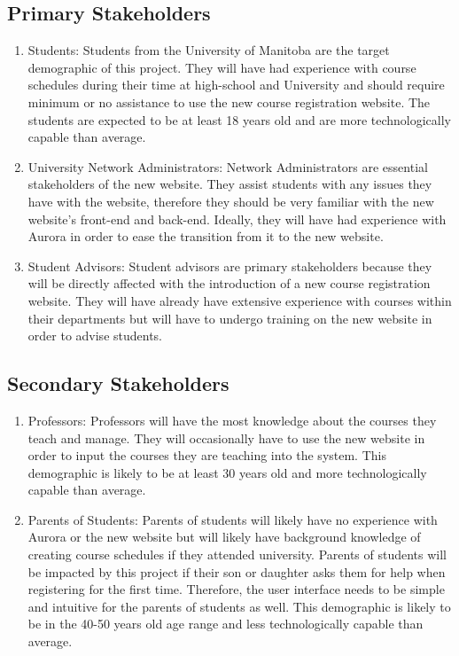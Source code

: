 \documentclass{article}
\begin{document}
\subsection{Primary Stakeholders}
\begin{enumerate}
    \item Students: Students from the University of Manitoba are the target demographic of this project. They will have had experience with course schedules during their time at high-school and University and should require minimum or no assistance to use the new course registration website. The students are expected to be at least 18 years old and are more technologically capable than average.
    \item University Network Administrators: Network Administrators are essential stakeholders of the new website. They assist students with any issues they have with the website, therefore they should be very familiar with the new website's front-end and back-end. Ideally, they will have had experience with Aurora in order to ease the transition from it to the new website.
    \item Student Advisors: Student advisors are primary stakeholders because they will be directly affected with the introduction of a new course registration website. They will have already have extensive experience with courses within their departments but will have to undergo training on the new website in order to advise students. 
\end{enumerate}

\subsection{Secondary Stakeholders}
\begin{enumerate}
    \item Professors: Professors will have the most knowledge about the courses they teach and manage. They will occasionally have to use the new website in order to input the courses they are teaching into the system. This demographic is likely to be at least 30 years old and more technologically capable than average.
    \item Parents of Students: Parents of students will likely have no experience with Aurora or the new website but will likely have background knowledge of creating course schedules if they attended university. Parents of students will be impacted by this project if their son or daughter asks them for help when registering for the first time. Therefore, the user interface needs to be simple and intuitive for the parents of students as well. This demographic is likely to be in the 40-50 years old age range and less technologically capable than average.
\end{enumerate}
\end{document}
